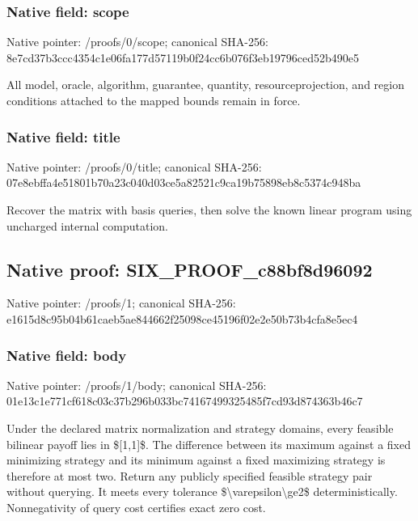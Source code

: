 \documentclass[10pt,a4paper]{article}
\begin{document}
\subsubsection{Native field: scope}


Native pointer: /proofs/0/scope; canonical SHA-256: 8e7cd37b3ccc4354c1e06fa1\allowbreak{}77d57119b0f24cc6b076f3eb\allowbreak{}19796ced52b490e5


All model, oracle, algorithm, guarantee, quantity, resourceprojection, and region conditions attached to the mapped bounds remain in force.


\subsubsection{Native field: title}


Native pointer: /proofs/0/title; canonical SHA-256: 07e8ebffa4e51801b70a23c0\allowbreak{}40d03ce5a82521c9ca19b758\allowbreak{}98eb8c5374c948ba


Recover the matrix with basis queries, then solve the known linear program using uncharged internal computation.


\subsection{Native proof: SIX\_PROOF\_c88bf8d96092}


Native pointer: /proofs/1; canonical SHA-256: e1615d8c95b04b61caeb5ae8\allowbreak{}44662f25098ce45196f02e2e\allowbreak{}50b73b4cfa8e5ec4



\subsubsection{Native field: body}


Native pointer: /proofs/1/body; canonical SHA-256: 01e13c1e771cf618c03c37b2\allowbreak{}96b033bc74167499325485f7\allowbreak{}cd93d874363b46c7


Under the declared matrix normalization and strategy domains, every feasible bilinear payoff lies in \$[1,1]\$. The difference between its maximum against a fixed minimizing strategy and its minimum against a fixed maximizing strategy is therefore at most two. Return any publicly specified feasible strategy pair without querying. It meets every tolerance \$\textbackslash{}varepsilon\textbackslash{}ge2\$ deterministically. Nonnegativity of query cost certifies exact zero cost.
\end{document}
